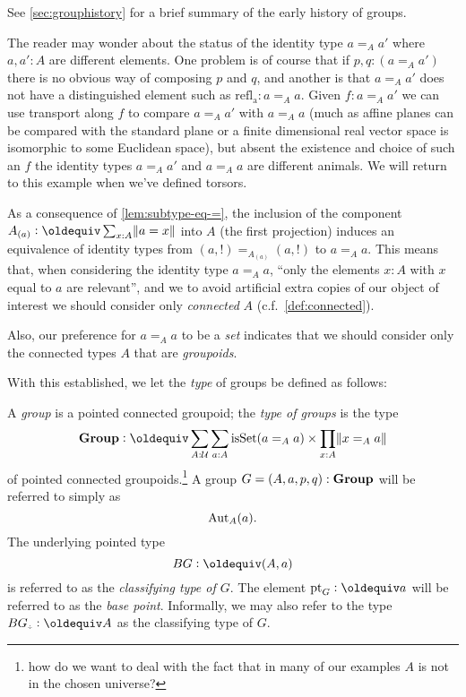 See \cref{sec:grouphistory} for a brief summary of the early history of groups.
\begin{remark}
  The reader may wonder about the status of the identity type $a=_Aa'$ where $a,a':A$ are different elements.  One problem is of course that if $p,q:(a=_Aa')$ there is no obvious way of composing $p$ and $q$, and another is that $a=_Aa'$ does not have a distinguished element such as $\mathrm{refl{}_a}:a=_Aa$.
Given $f:a=_Aa'$ we can use transport along $f$ to compare $a=_Aa'$ with $a=_Aa$ (much as affine planes can be compared with the standard plane or a finite dimensional real vector space is isomorphic to some Euclidean space), but absent the existence and choice of such an $f$ the identity types $a=_Aa'$ and $a=_Aa$ are different animals.  
We will return to this example when we've defined torsors.
\end{remark}


\begin{remark}
  \label{rem:whypointedconngpoid}
As a consequence of \cref{lem:subtype-eq-=},
the inclusion of the component $A_{(a)}\defequi\sum_{x:A}\Trunc{a=x}$ into $A$ (\ie the first projection) induces an equivalence of identity types
from $(a,!)=_{A_{(a)}}(a,!)$ to $a=_Aa$.
  This means that, when considering the identity type $a=_Aa$, ``only the elements $x:A$ with $x$ equal to $a$ are relevant'', and we to avoid artificial extra copies of our object of interest we should consider only \emph{connected} $A$ (c.f.~\cref{def:connected}).  

Also, our preference for $a=_Aa$ to be a \emph{set} indicates that we should consider only the connected types $A$ that are \emph{groupoids}.
\end{remark}


With this established, we let the \emph{type} of groups be defined as follows:

\begin{definition}\label{def:typegroup}
  A \emph{group} is a pointed connected groupoid; the \emph{type of groups} is the type 
$$\typegroup\defequi\sum_{A:\UU}\sum_{a:A}\isset(a=_Aa)\times\prod_{x:A}\Trunc{x=_Aa}$$
of pointed connected groupoids.\footnote{how do we want to deal with the fact that in many of our examples $A$ is not in the chosen universe?} 
A group $G=(A,a,p,q):\mathbf{Group}$ will be referred to simply as $$\mathrm{Aut}_A(a).$$  The underlying pointed type $$BG\defequi(A,a)$$ is referred to as the \emph{classifying type of $G$}.  The element $\pt_G\defequi a$ will be referred to as the \emph{base point}.
Informally, we may also refer to the type $BG_\div\defequi A$ as the classifying type of $G$.
\end{definition}

